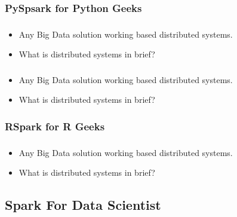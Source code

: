 \subsubsection{PySpsark for Python Geeks}

\begin{frame}
  \frametitle{\subsecname}
	\begin{itemize}[<+->]
		\item Any Big Data solution working based distributed systems.
		\item What is distributed systems in brief?
	\end{itemize}
\end{frame}


\begin{frame}
  \frametitle{\subsecname}
	\begin{itemize}[<+->]
		\item Any Big Data solution working based distributed systems.
		\item What is distributed systems in brief?
	\end{itemize}
\end{frame}

\subsubsection{RSpark for R Geeks}

\begin{frame}
  \frametitle{\subsecname}
	\begin{itemize}[<+->]
		\item Any Big Data solution working based distributed systems.
		\item What is distributed systems in brief?
	\end{itemize}
\end{frame}


\subsection{Spark For Data Scientist}

